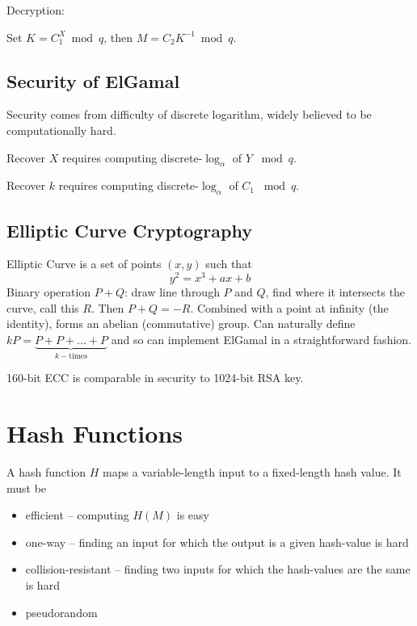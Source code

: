 \documentclass[final]{article}
\begin{document}
Decryption:

Set $K=C_1^X\bmod{q}$, then $M = C_2K^{-1}\bmod{q}$.

\subsection{Security of ElGamal}
Security comes from difficulty of discrete logarithm, widely believed to be computationally hard.

Recover $X$ requires computing discrete-$\log_{\alpha}$ of $Y$ $\bmod{q}$.

Recover $k$ requires computing discrete-$\log_{\alpha}$ of $C_1$ $\bmod{q}$.
\subsection{Elliptic Curve Cryptography}
Elliptic Curve is a set of points $(x,y)$ such that \[y^2=x^3+ax+b\] Binary operation $P + Q$: draw line through $P$ and $Q$, find where it intersects the curve, call this $R$. Then $P+Q = -R$. Combined with a point at infinity (the identity), forms an abelian (commutative) group. Can naturally define $kP = \underbrace{P + P + \dots + P}_{k-\text{times}}$ and so can implement ElGamal in a straightforward fashion.

160-bit ECC is comparable in security to 1024-bit RSA key.
\section{Hash Functions}
A hash function $H$ maps a variable-length input to a fixed-length hash value. It must be
\begin{itemize}[nosep]
    \item efficient -- computing $H(M)$ is easy
    \item one-way -- finding an input for which the output is a given hash-value is hard
    \item collision-resistant -- finding two inputs for which the hash-values are the same is hard
    \item pseudorandom
\end{itemize}
\end{document}
